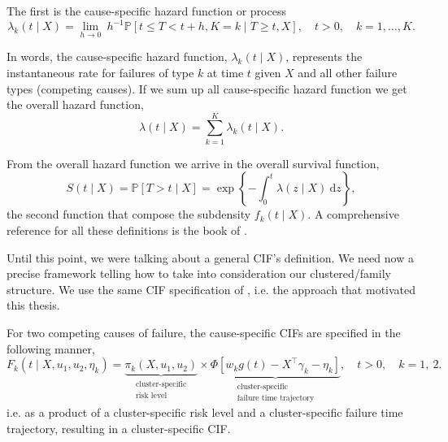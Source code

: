 The first is the cause-specific hazard function or process
\[
  \lambda_{k}(t \mid X) =
  \lim_{h \rightarrow 0}~h^{-1}
  \mathbb{P}[t \leq T < t + h, K = k \mid T \geq t, X],
  \quad t > 0, \quad k = 1, \dots, K.
\]

In words, the cause-specific hazard function, \(\lambda_{k}(t \mid X)\),
represents the instantaneous rate for failures of type \(k\) at time
\(t\) given \(X\) and all other failure types (competing causes). If
we sum up all cause-specific hazard function we get the overall hazard
function,
\[
  \lambda(t \mid X) = \sum_{k=1}^{K}\lambda_{k}(t \mid X).
\]

From the overall hazard function we arrive in the overall survival function,
\[
  S(t \mid X) =
  \mathbb{P}[T > t \mid X] =
  \exp\left\{-\int_{0}^{t} \lambda(z \mid X)~\text{d}z\right\},
\]
the second function that compose the subdensity \(f_{k}(t \mid X)\). A
comprehensive reference for all these definitions is the book of
.

Until this point, we were talking about a general CIF's definition. We
need now a precise framework telling how to take into consideration our
clustered/family structure. We use the same CIF specification of
, i.e. the approach that motivated this thesis.

For two competing causes of failure, the cause-specific CIFs are
specified in the following manner,
\begin{equation}
  F_{k} (t \mid X, u_{1}, u_{2}, \eta_{k}) =
  \underbrace{\pi_{k}(X, u_{1}, u_{2})}_{
    \substack{\text{cluster-specific}\\\text{risk level}}}\times
  \underbrace{\Phi[w_{k} g(t) - X^{\top}\gamma_{k} - \eta_{k}]}_{
    \substack{\text{cluster-specific}\\\text{failure time trajectory}}
  }, \quad t > 0, \quad k = 1,~2.
  \label{eq:cif}
\end{equation}
i.e. as a product of a cluster-specific risk level and a
cluster-specific failure time trajectory, resulting in a
cluster-specific CIF.

